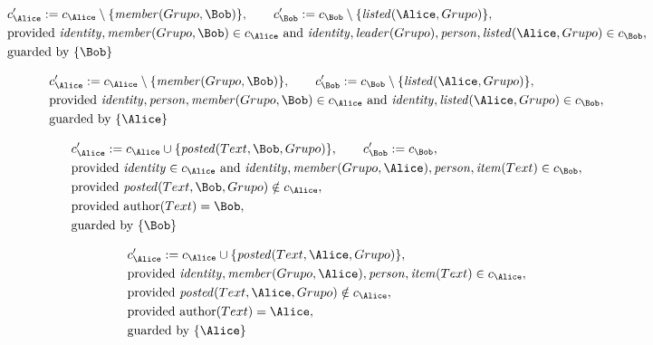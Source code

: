 \begin{align*}
&
c'_
{
\Alice
}
 := 
c_
{
\Alice
}
 \setminus 
\{
\mathit{\detokenize{
member
}}
(
Grupo
,
\Bob
)
\}
, \qquad 
c'_
{
\Bob
}
 := 
c_
{
\Bob
}
 \setminus 
\{
\mathit{\detokenize{
listed
}}
(
\Alice
,
Grupo
)
\}
,\\
&
\text{provided } 
\mathit{\detokenize{
identity
}}
,
\mathit{\detokenize{
member
}}
(
Grupo
,
\Bob
)
 \in c_
{
\Alice
}
 \text{ and } 
\mathit{\detokenize{
identity
}}
,
\mathit{\detokenize{
leader
}}
(
Grupo
)
,
\mathit{\detokenize{
person
}}
,
\mathit{\detokenize{
listed
}}
(
\Alice
,
Grupo
)
 \in c_
{
\Bob
}
,\\
&
\text{guarded by } \{
\Bob
\}
\end{align*}

\begin{align*}
&
c'_
{
\Alice
}
 := 
c_
{
\Alice
}
 \setminus 
\{
\mathit{\detokenize{
member
}}
(
Grupo
,
\Bob
)
\}
, \qquad 
c'_
{
\Bob
}
 := 
c_
{
\Bob
}
 \setminus 
\{
\mathit{\detokenize{
listed
}}
(
\Alice
,
Grupo
)
\}
,\\
&
\text{provided } 
\mathit{\detokenize{
identity
}}
,
\mathit{\detokenize{
person
}}
,
\mathit{\detokenize{
member
}}
(
Grupo
,
\Bob
)
 \in c_
{
\Alice
}
 \text{ and } 
\mathit{\detokenize{
identity
}}
,
\mathit{\detokenize{
listed
}}
(
\Alice
,
Grupo
)
 \in c_
{
\Bob
}
,\\
&
\text{guarded by } \{
\Alice
\}
\end{align*}

\begin{align*}
&
c'_
{
\Alice
}
 := 
c_
{
\Alice
}
 \cup 
\{
\mathit{\detokenize{
posted
}}
(
Text
,
\Bob
,
Grupo
)
\}
, \qquad 
c'_
{
\Bob
}
 := 
c_
{
\Bob
}
,\\
&
\text{provided } 
\mathit{\detokenize{
identity
}}
 \in c_
{
\Alice
}
 \text{ and } 
\mathit{\detokenize{
identity
}}
,
\mathit{\detokenize{
member
}}
(
Grupo
,
\Alice
)
,
\mathit{\detokenize{
person
}}
,
\mathit{\detokenize{
item
}}
(
Text
)
 \in c_
{
\Bob
}
,\\
&
\text{provided } 
\mathit{\detokenize{
posted
}}
(
Text
,
\Bob
,
Grupo
)
 \notin c_
{
\Alice
}
,\\
&
\text{provided } 
\mathrm{author}(
Text
)
=
\Bob
,\\
&
\text{guarded by } \{
\Bob
\}
\end{align*}

\begin{align*}
&
c'_
{
\Alice
}
 := 
c_
{
\Alice
}
 \cup 
\{
\mathit{\detokenize{
posted
}}
(
Text
,
\Alice
,
Grupo
)
\}
,\\
&
\text{provided } 
\mathit{\detokenize{
identity
}}
,
\mathit{\detokenize{
member
}}
(
Grupo
,
\Alice
)
,
\mathit{\detokenize{
person
}}
,
\mathit{\detokenize{
item
}}
(
Text
)
 \in c_
{
\Alice
}
,\\
&
\text{provided } 
\mathit{\detokenize{
posted
}}
(
Text
,
\Alice
,
Grupo
)
 \notin c_
{
\Alice
}
,\\
&
\text{provided } 
\mathrm{author}(
Text
)
=
\Alice
,\\
&
\text{guarded by } \{
\Alice
\}
\end{align*}
